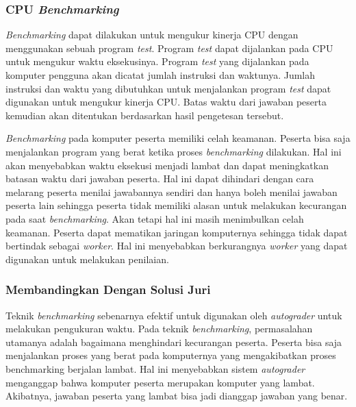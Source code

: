 \subsubsection{CPU \textit{Benchmarking}}

\par \textit{Benchmarking} dapat dilakukan untuk mengukur kinerja CPU dengan menggunakan sebuah program \textit{test}. Program \textit{test} dapat dijalankan pada CPU untuk mengukur waktu eksekusinya. Program \textit{test} yang dijalankan pada komputer pengguna akan dicatat jumlah instruksi dan waktunya. Jumlah instruksi dan waktu yang dibutuhkan untuk menjalankan program \textit{test} dapat digunakan untuk mengukur kinerja CPU. Batas waktu dari jawaban peserta kemudian akan ditentukan berdasarkan hasil pengetesan tersebut.

\par \textit{Benchmarking} pada komputer peserta memiliki celah keamanan. Peserta bisa saja menjalankan program yang berat ketika proses \textit{benchmarking} dilakukan. Hal ini akan menyebabkan waktu eksekusi menjadi lambat dan dapat meningkatkan batasan waktu dari jawaban peserta. Hal ini dapat dihindari dengan cara melarang peserta menilai jawabannya sendiri dan hanya boleh menilai jawaban peserta lain sehingga peserta tidak memiliki alasan untuk melakukan kecurangan pada saat \textit{benchmarking}. Akan tetapi hal ini masih menimbulkan celah keamanan. Peserta dapat mematikan jaringan komputernya sehingga tidak dapat bertindak sebagai \textit{worker}. Hal ini menyebabkan berkurangnya \textit{worker} yang dapat digunakan untuk melakukan penilaian.

\subsubsection{Membandingkan Dengan Solusi Juri} \label{subsec:time-memory-measure-compare-with-jury}

\par Teknik \textit{benchmarking} sebenarnya efektif untuk digunakan oleh \textit{autograder} untuk melakukan pengukuran waktu. Pada teknik \textit{benchmarking}, permasalahan utamanya adalah bagaimana menghindari kecurangan peserta. Peserta bisa saja menjalankan proses yang berat pada komputernya yang mengakibatkan proses benchmarking berjalan lambat. Hal ini menyebabkan sistem \textit{autograder} menganggap bahwa komputer peserta merupakan komputer yang lambat. Akibatnya, jawaban peserta yang lambat bisa jadi dianggap jawaban yang benar.

